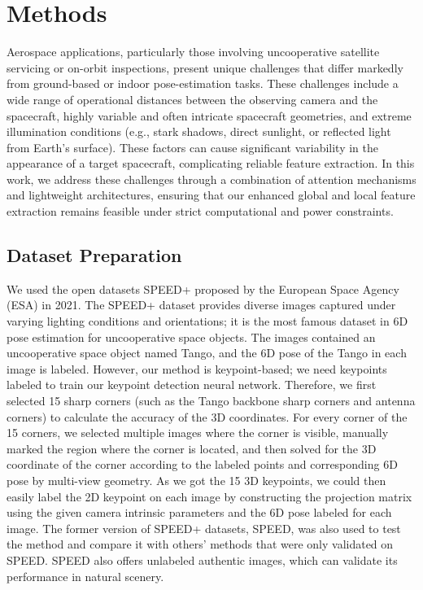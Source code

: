\documentclass[a4paper,fleqn]{cas-sc}
\begin{document}
\section{Methods}\label{sec:method}
Aerospace applications, particularly those involving uncooperative satellite servicing 
or on-orbit inspections, present unique challenges that differ markedly from ground-based 
or indoor pose-estimation tasks. These challenges include a wide range of operational 
distances between the observing camera and the spacecraft, highly variable and often 
intricate spacecraft geometries, and extreme illumination conditions (e.g., stark shadows, 
direct sunlight, or reflected light from Earth’s surface). These factors can cause 
significant variability in the appearance of a target spacecraft, complicating reliable 
feature extraction. In this work, we address these challenges through a combination 
of attention mechanisms and lightweight architectures, ensuring that our enhanced global 
and local feature extraction remains feasible under strict computational and power constraints.

\subsection{Dataset Preparation}
We used the open datasets SPEED+ \citep{speed+} proposed by the European Space Agency (ESA) in 2021. The SPEED+ dataset provides diverse images captured under varying lighting conditions and orientations; it is the most famous dataset in 6D pose estimation for uncooperative space objects. The images contained an uncooperative space object named Tango, and the 6D pose of the Tango in each image is labeled. However, our method is keypoint-based; we need keypoints labeled to train our keypoint detection neural network. Therefore, we first selected 15 sharp corners (such as the Tango backbone sharp corners and antenna corners) to calculate the accuracy of the 3D coordinates. For every corner of the 15 corners, we selected multiple images where the corner is visible, manually marked the region where the corner is located, and then solved for the 3D coordinate of the corner according to the labeled points and corresponding 6D pose by multi-view geometry. As we got the 15 3D keypoints, we could then easily label the 2D keypoint on each image by constructing the projection matrix using the given camera intrinsic parameters and the 6D pose labeled for each image. The former version of SPEED+ datasets, SPEED, was also used to test the method and compare it with others' methods that were only validated on SPEED. SPEED also offers unlabeled authentic images, which can validate its performance in natural scenery.
\end{document}
